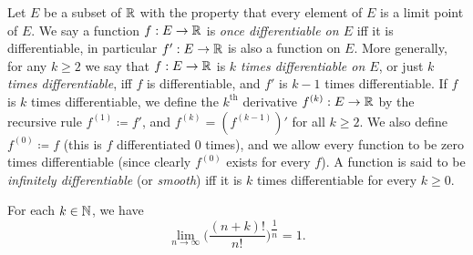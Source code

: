 \begin{defn}\label{4.2.4}
  Let \(E\) be a subset of \(\mathbb{R}\) with the property that every element of \(E\) is a limit point of \(E\).
  We say a function \(f : E \to \mathbb{R}\) is \emph{once differentiable on \(E\)} iff it is differentiable, in particular \(f': E \to \mathbb{R}\) is also a function on \(E\).
  More generally, for any \(k \geq 2\) we say that \(f : E \to \mathbb{R}\) is \emph{\(k\) times differentiable on \(E\)}, or just \emph{\(k\) times differentiable}, iff \(f\) is differentiable, and \(f'\) is \(k - 1\) times differentiable.
  If \(f\) is \(k\) times differentiable, we define the \(k^{\text{th}}\) derivative \(f^{(k)} : E \to \mathbb{R}\) by the recursive rule \(f^{(1)} \coloneqq f'\), and \(f^{(k)} = (f^{(k - 1)})'\) for all \(k \geq 2\).
  We also define \(f^{(0)} \coloneqq f\) (this is \(f\) differentiated \(0\) times), and we allow every function to be zero times differentiable (since clearly \(f^{(0)}\) exists for every \(f\)).
  A function is said to be \emph{infinitely differentiable} (or \emph{smooth}) iff it is \(k\) times differentiable for every \(k \geq 0\).
\end{defn}

\begin{ac}\label{ac:4.2.1}
  For each \(k \in \mathbb{N}\), we have
  \[
    \lim_{n \to \infty} \bigg(\dfrac{(n + k)!}{n!}\bigg)^{\dfrac{1}{n}} = 1.
  \]
\end{ac}

